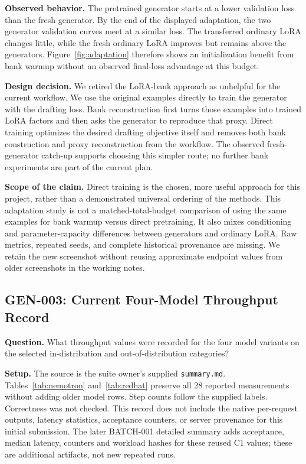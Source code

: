 \textbf{Observed behavior.} The pretrained generator starts at a lower
validation loss than the fresh generator. By the end of the displayed adaptation,
the two generator validation curves meet at a similar loss. The transferred
ordinary LoRA changes little, while the fresh ordinary LoRA improves but remains
above the generators. Figure~\ref{fig:adaptation} therefore shows an initialization
benefit from bank warmup without an observed final-loss advantage at this budget.

\textbf{Design decision.} We retired the LoRA-bank approach as unhelpful for the
current workflow. We use the original examples directly to train the generator
with the drafting loss. Bank reconstruction first turns those examples into
trained LoRA factors and then asks the generator to reproduce that proxy.
Direct training optimizes the desired drafting objective itself and removes
both bank construction and proxy reconstruction from the workflow. The observed
fresh-generator catch-up supports choosing this simpler route; no further bank
experiments are part of the current plan.

\textbf{Scope of the claim.} Direct training is the chosen, more useful approach
for this project, rather than a demonstrated universal ordering of the methods.
This adaptation study is not a matched-total-budget comparison of using the same
examples for bank warmup versus direct pretraining. It also mixes conditioning
and parameter-capacity differences between generators and ordinary LoRA. Raw
metrics, repeated seeds, and complete historical provenance are missing.
We retain the new screenshot without reusing approximate endpoint values from
older screenshots in the working notes.

\subsection{GEN-003: Current Four-Model Throughput Record}

\textbf{Question.} What throughput values were recorded for the four model
variants on the selected in-distribution and out-of-distribution categories?

\textbf{Setup.} The source is the suite owner's supplied
\texttt{summary.md}. Tables~\ref{tab:nemotron} and~\ref{tab:redhat} preserve all
28 reported measurements without adding older model rows. Step counts follow
the supplied labels. Correctness was not checked. This record does not include
the native per-request outputs, latency statistics, acceptance counters, or
server provenance for this initial submission. The later BATCH-001 detailed
summary adds acceptance, median latency, counters and workload hashes for these
reused C1 values; these are additional artifacts, not new repeated runs.

